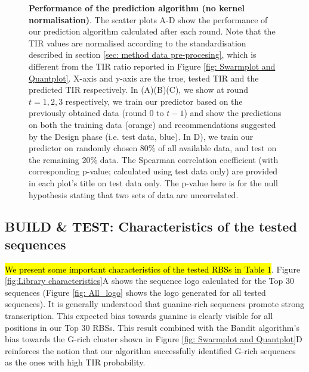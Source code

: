 \documentclass{article}
\begin{document}
\begin{figure}[!ht]
\begin{subfigure}[b]{0.49\textwidth}
    \end{subfigure}
    \caption{\textbf{Performance of the prediction algorithm (no kernel normalisation)}. The scatter plots A-D show the performance of our prediction algorithm calculated after each round.
    Note that the TIR values are normalised according to the standardisation described in section \ref{sec: method data pre-procesing}, which is different from the TIR ratio reported in Figure \ref{fig: Swarmplot and Quantplot}.
    X-axis and y-axis are the true, tested TIR and the predicted TIR respectively.
    In (A)(B)(C), we show at round $t = 1,2,3$ respectively, we train our predictor based on the previously obtained data (round 0 to $t-1$) and show the predictions on both the training data (orange) and recommendations suggested by the Design phase (i.e. test data, blue).
    In D), we train our predictor on randomly chosen 80\% of all available data, and test on the remaining 20\% data.
    The Spearman correlation coefficient (with corresponding p-value; calculated using test data only) are provided in each plot's title on test data only.
    The p-value here is for the null hypothesis stating that two sets of data are uncorrelated.
    }
    \label{fig: Scatterplot}
\end{figure}

\subsection{BUILD \& TEST: Characteristics of the tested sequences}
\label{sec:characteristics-of-library}


\hl{We present some important characteristics of the tested RBSs in Table 1}.
Figure \ref{fig:Library characteristics}A shows the sequence logo calculated for the Top 30 sequences (Figure \ref{fig: All_logo} shows the logo generated for all tested sequences).
It is generally understood that guanine-rich sequences promote strong transcription.
This expected bias towards guanine is clearly visible for all positions in our Top 30 RBSs.
This result combined with the Bandit algorithm's bias towards the G-rich cluster shown in Figure \ref{fig: Swarmplot and Quantplot}D reinforces the notion that our algorithm successfully identified G-rich sequences as the ones with high TIR probability.\\
\end{document}
